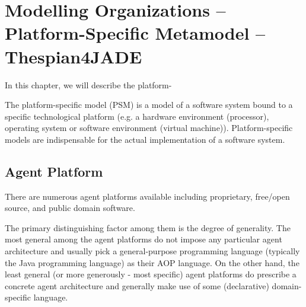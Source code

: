 
\chapter{Modelling Organizations -- Platform-Specific Metamodel -- Thespian4JADE}

In this chapter, we will describe the platform-

The platform-specific model (PSM) is a model of a software system bound to a specific technological platform (e.g. a hardware environment (processor), operating system or software environment (virtual machine)).
Platform-specific models are indispensable for the actual implementation of a software system.

\section{Agent Platform}

There are numerous agent platforms available including proprietary, free/open source, and public domain software.

The primary distinguishing factor among them is the degree of generality.
The most general among the agent platforms do not impose any particular agent architecture and usually pick a general-purpose programming language (typically the Java programming language) as their AOP language.
On the other hand, the least general (or more generously - most specific) agent platforms do prescribe a concrete agent architecture and generally make use of some (declarative) domain-specific language.

